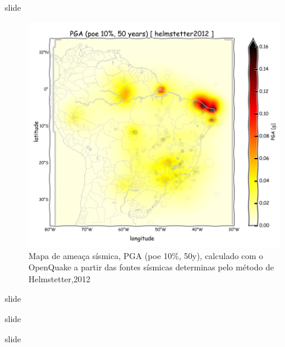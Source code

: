 \documentclass[ucs,8pt]{beamer}
\begin{document}
\begin{frame}{slide}

\begin{figure}[H]
  \centering
  \includegraphics[height=.80\textheight]{pga_helmstetter} 
  \caption{Mapa de ameaça sísmica, PGA (poe 10\%, 50y), 
  		   calculado com o OpenQuake a partir das fontes sísmicas
  		   determinas pelo método de Helmstetter,2012 }
  \label{fig:helm_h} 
\end{figure}

\end{frame}



\begin{frame}{slide}


\end{frame}



\begin{frame}{slide}


\end{frame}



\begin{frame}{slide}


\end{frame}
\end{document}
